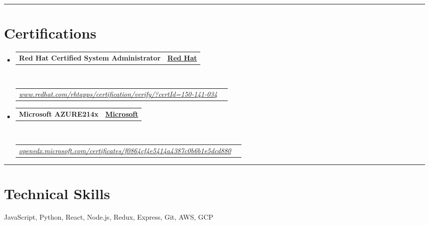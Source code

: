 \documentclass[10pt,a4paper,hidelinks]{article}
\makeatletter
\newenvironment{indentsection}[1]%
{\begin{list}{}%
	{\setlength{\leftmargin}{#1}}%
	\item[]%
}
{\end{list}}
\newcommand{\headerrow}[2]
{\begin{tabular*}{\linewidth}{l@{\extracolsep{\fill}}r}
	#1 &
	#2 \\
\end{tabular*}}
\makeatother
\begin{document}
\hrule
\vspace{-0.4em}
\section*{Certifications}

\begin{itemize}
	\parskip=0.1em

	\item 
	\headerrow
		{\textbf{Red Hat Certified System Administrator}}
		{{\href{https://www.redhat.com/}{\textbf{Red Hat}}}}
	\\
	\headerrow
	    {\emph{\href{https://www.redhat.com/rhtapps/certification/verify/?certId=150-141-034}{www.redhat.com/rhtapps/certification/verify/?certId=150-141-034}}}
		{\emph{}}
	
	\item 
	\headerrow
		{\textbf{Microsoft AZURE214x}}
		{{\href{https://www.microsoft.com/}{\textbf{Microsoft}}}}
	\\
	\headerrow
	    {\emph{\href{https://openedx.microsoft.com/certificates/f0864cf4e5414a4387c0b6b1e5dcd880}{openedx.microsoft.com/certificates/f0864cf4e5414a4387c0b6b1e5dcd880}}}
		{\emph{}}

\end{itemize}


\hrule
\vspace{-0.4em}
\section*{Technical Skills}

\begin{indentsection}{\parindent}
\begin{description*}
    JavaScript, Python, React, Node.js, Redux, Express, Git, AWS, GCP 
\end{description*}
\end{indentsection}
\end{document}
